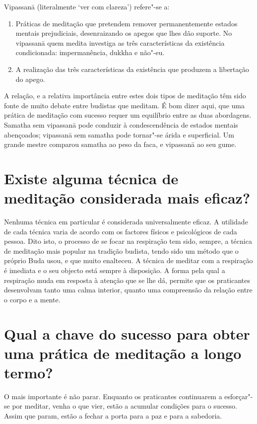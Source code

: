 Vipassanā (literalmente `ver com clareza') refere"-se a:

\begin{enumerate}
\item
  Práticas de meditação que pretendem remover permanentemente estados
  mentais prejudiciais, desenraizando os apegos que lhes dão suporte. No
  vipassanā quem medita investiga as três características da existência
  condicionada: impermanência, dukkha e não"-eu.
\item
  A realização das três características da existência que produzem a
  libertação do apego.
\end{enumerate}

A relação, e a relativa importância entre estes dois tipos de meditação
têm sido fonte de muito debate entre budistas que meditam. É bom dizer
aqui, que uma prática de meditação com sucesso requer um equilíbrio
entre as duas abordagens. Samatha sem vipassanā pode conduzir à
condescendência de estados mentais abençoados; vipassanā sem samatha
pode tornar"-se árida e superficial. Um grande mestre comparou samatha ao
peso da faca, e vipassanā ao seu gume.

\section{Existe alguma técnica de meditação considerada mais eficaz?}

Nenhuma técnica em particular é considerada universalmente eficaz. A
utilidade de cada técnica varia de acordo com os factores físicos e
psicológicos de cada pessoa. Dito isto, o processo de se focar na
respiração tem sido, sempre, a técnica de meditação mais popular na
tradição budista, tendo sido um método que o próprio Buda usou, e que
muito enalteceu. A técnica de meditar com a respiração é imediata e o
seu objecto está sempre à disposição. A forma pela qual a respiração
muda em resposta à atenção que se lhe dá, permite que os praticantes
desenvolvam tanto uma calma interior, quanto uma compreensão da relação
entre o corpo e a mente.

\section{Qual a chave do sucesso para obter uma prática de meditação a longo
  termo?}

O mais importante é não parar. Enquanto os praticantes continuarem a
esforçar"-se por meditar, venha o que vier, estão a acumular condições
para o sucesso. Assim que param, estão a fechar a porta para a paz e
para a sabedoria.

